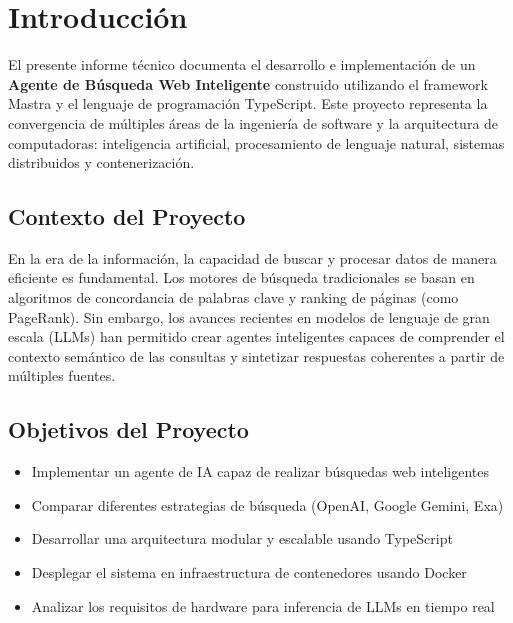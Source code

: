 \documentclass[12pt,a4paper]{article}
\begin{document}
\newpage
\tableofcontents
\newpage

\section{Introducción}

El presente informe técnico documenta el desarrollo e implementación de un \textbf{Agente de Búsqueda Web Inteligente} construido utilizando el framework Mastra y el lenguaje de programación TypeScript. Este proyecto representa la convergencia de múltiples áreas de la ingeniería de software y la arquitectura de computadoras: inteligencia artificial, procesamiento de lenguaje natural, sistemas distribuidos y contenerización.

\subsection{Contexto del Proyecto}

En la era de la información, la capacidad de buscar y procesar datos de manera eficiente es fundamental. Los motores de búsqueda tradicionales se basan en algoritmos de concordancia de palabras clave y ranking de páginas (como PageRank). Sin embargo, los avances recientes en modelos de lenguaje de gran escala (LLMs) han permitido crear agentes inteligentes capaces de comprender el contexto semántico de las consultas y sintetizar respuestas coherentes a partir de múltiples fuentes.

\subsection{Objetivos del Proyecto}

\begin{itemize}
    \item Implementar un agente de IA capaz de realizar búsquedas web inteligentes
    \item Comparar diferentes estrategias de búsqueda (OpenAI, Google Gemini, Exa)
    \item Desarrollar una arquitectura modular y escalable usando TypeScript
    \item Desplegar el sistema en infraestructura de contenedores usando Docker
    \item Analizar los requisitos de hardware para inferencia de LLMs en tiempo real
\end{itemize}
\end{document}
